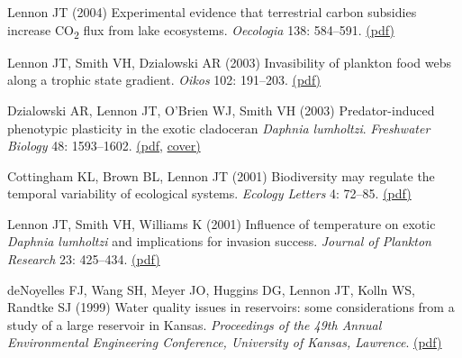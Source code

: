 \documentclass[11pt]{article}
\begin{document}
\begin{etaremune}
\item Lennon JT (2004) Experimental evidence that terrestrial carbon subsidies increase CO\textsubscript{2} flux from lake ecosystems. \textit{Oecologia} 138: 584–591. \href{https://lennonlab.github.io/assets/publications/Lennon_2004.pdf}{(pdf)}

\item Lennon JT, Smith VH, Dzialowski AR (2003) Invasibility of plankton food webs along a trophic state gradient. \textit{Oikos} 102: 191–203. \href{https://lennonlab.github.io/assets/publications/Lennon_etal_2003.pdf}{(pdf)}

\item Dzialowski AR, Lennon JT, O'Brien WJ, Smith VH (2003) Predator-induced phenotypic plasticity in the exotic cladoceran \textit{Daphnia lumholtzi}. \textit{Freshwater Biology} 48: 1593–1602. \href{https://lennonlab.github.io/assets/publications/Dzialowski_etal_2003.pdf}{(pdf}, \href{https://lennonlab.github.io/assets/publications/Dzialowski_etal_2003_Cover.pdf}{cover)}

\item Cottingham KL, Brown BL, Lennon JT (2001) Biodiversity may regulate the temporal variability of ecological systems. \textit{Ecology Letters} 4: 72–85. \href{https://lennonlab.github.io/assets/publications/Cottingham_etal_2001.pdf}{(pdf)}

\item Lennon JT, Smith VH, Williams K (2001) Influence of temperature on exotic \textit{Daphnia lumholtzi} and implications for invasion success. \textit{Journal of Plankton Research} 23: 425–434. \href{https://lennonlab.github.io/assets/publications/Lennon_etal_2001.pdf}{(pdf)}

\item deNoyelles FJ, Wang SH, Meyer JO, Huggins DG, Lennon JT, Kolln WS, Randtke SJ (1999) Water quality issues in reservoirs: some considerations from a study of a large reservoir in Kansas. \textit{Proceedings of the 49th Annual Environmental Engineering Conference, University of Kansas, Lawrence}. \href{https://lennonlab.github.io/assets/publications/deNoyelles_etal_1999.pdf}{(pdf)}

\end{etaremune}
\end{document}
